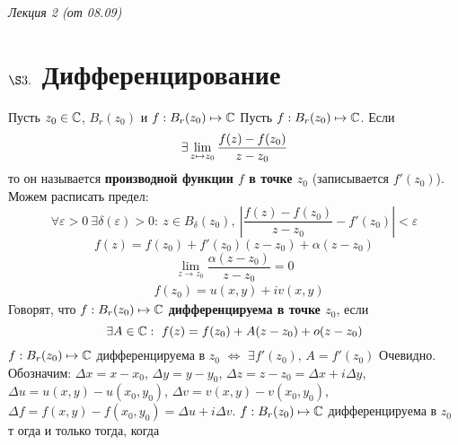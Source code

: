 \begin{flushright}
    \textit{Лекция 2 (от 08.09)}
\end{flushright}
\section{$\S 3.$ Дифференцирование}
Пусть $z_0 \in \mathbb{C}$, $B_r(z_0)$ и $f: B_r(z_0) \mapsto \mathbb{C}$
\Def
Пусть $f: B_r(z_0) \mapsto \mathbb{C}$. Если
\begin{equation}\label{(3.1)}
    \exists \displaystyle \lim_{z \mapsto z_0} \frac{f(z)-f(z_0)}{z-z_0}
\end{equation}
то он называется \textbf{производной функции $f$ в точке $z_0$} (записывается
$f'(z_0)$).
\\
Можем расписать предел:
\begin{equation}\label{(3.2)}
    \forall \varepsilon > 0 \ \exists \delta(\varepsilon)>0: \ z \in B_\delta(z_0), \ \left| \frac{f(z) - f(z_0)}{z-z_0} - f'(z_0) \right| < \varepsilon
\end{equation}
\begin{equation}\label{(3.3)}
    f(z) = f(z_0) + f'(z_0)(z-z_0) + \alpha(z-z_0)
\end{equation}
\begin{equation}\label{(3.4)}
    \lim_{z \to z_0}\frac{\alpha(z-z_0)}{z-z_0} = 0
\end{equation}
\begin{align*}
  & f(z_0) = u(x,y) + iv(x,y)
\end{align*}
\Def
Говорят, что $f: B_r(z_0) \mapsto \mathbb{C}$ \textbf{дифференцируема в точке $z_0$},
если
\begin{equation}\label{(3.5)}
    \exists A \in \mathbb{C}: \ f(z) = f(z_0)+A(z-z_0)+o(z-z_0)
\end{equation}
\lemma
$f: B_r(z_0) \mapsto \mathbb{C}$ дифференцируема в $z_0$ $\Leftrightarrow$ $\exists
f'(z_0)$, $A = f'(z_0)$
\pr
Очевидно.
\\
Обозначим: $\Delta x = x-x_0$, $\Delta y = y - y_0$, $\Delta z = z-z_0 = \Delta
x + i \Delta y$, $\Delta u = u(x,y)-u(x_0,y_0)$, $\Delta v = v(x,y)-v(x_0,y_0)$,
$\Delta f = f(x,y)-f(x_0,y_0) = \Delta u + i \Delta v$.
\theorem
$f: B_r(z_0) \mapsto \mathbb{C}$ дифференцируема в $z_0$ т огда и только тогда, когда

